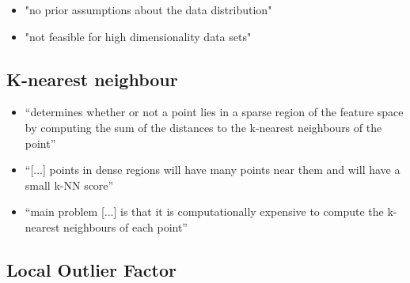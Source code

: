 	\begin{itemize}
		\item "no prior assumptions about the data distribution" \parencite{Hodge2004}
		\item "not feasible for high dimensionality data sets" \parencite{Hodge2004}
		
	\end{itemize}

	\subsection{K-nearest neighbour}
	\label{sec:background:network:novelty:knn}
	
	\begin{itemize}
		\item \enquote{determines whether or not a point lies in a sparse region of the feature space by computing the sum of the distances to the k-nearest neighbours of the point} \parencite{Eskin2002}
		\item \enquote{[...] points in dense regions will have many points near them and will have a small k-NN score} \parencite{Eskin2002}
		\item \enquote{main problem [...] is that it is computationally expensive to compute the k-nearest neighbours of each point} \parencite{Eskin2002}
		
	\end{itemize}
	
	\subsection{Local Outlier Factor}
	\label{sec:background:network:novelty:lof}
	
